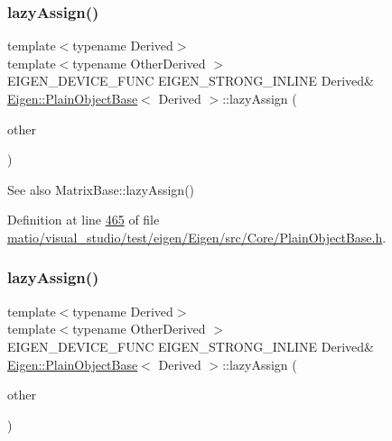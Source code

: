 \subsubsection{\texorpdfstring{lazy\+Assign()}{lazyAssign()}\hspace{0.1cm}{\footnotesize\ttfamily [1/2]}}
{\footnotesize\ttfamily template$<$typename Derived$>$ \\
template$<$typename Other\+Derived $>$ \\
E\+I\+G\+E\+N\+\_\+\+D\+E\+V\+I\+C\+E\+\_\+\+F\+U\+NC E\+I\+G\+E\+N\+\_\+\+S\+T\+R\+O\+N\+G\+\_\+\+I\+N\+L\+I\+NE Derived\& \hyperlink{class_eigen_1_1_plain_object_base}{Eigen\+::\+Plain\+Object\+Base}$<$ Derived $>$\+::lazy\+Assign (\begin{DoxyParamCaption}\item[{const \hyperlink{group___core___module_class_eigen_1_1_dense_base}{Dense\+Base}$<$ Other\+Derived $>$ \&}]{other }\end{DoxyParamCaption})\hspace{0.3cm}{\ttfamily [inline]}}

\begin{DoxySeeAlso}{See also}
Matrix\+Base\+::lazy\+Assign() 
\end{DoxySeeAlso}


Definition at line \hyperlink{matio_2visual__studio_2test_2eigen_2_eigen_2src_2_core_2_plain_object_base_8h_source_l00465}{465} of file \hyperlink{matio_2visual__studio_2test_2eigen_2_eigen_2src_2_core_2_plain_object_base_8h_source}{matio/visual\+\_\+studio/test/eigen/\+Eigen/src/\+Core/\+Plain\+Object\+Base.\+h}.

\mbox{\label{class_eigen_1_1_plain_object_base_a6008cee3b716d514b3e14c1bc7c0d34a}} 
\subsubsection{\texorpdfstring{lazy\+Assign()}{lazyAssign()}\hspace{0.1cm}{\footnotesize\ttfamily [2/2]}}
{\footnotesize\ttfamily template$<$typename Derived$>$ \\
template$<$typename Other\+Derived $>$ \\
E\+I\+G\+E\+N\+\_\+\+D\+E\+V\+I\+C\+E\+\_\+\+F\+U\+NC E\+I\+G\+E\+N\+\_\+\+S\+T\+R\+O\+N\+G\+\_\+\+I\+N\+L\+I\+NE Derived\& \hyperlink{class_eigen_1_1_plain_object_base}{Eigen\+::\+Plain\+Object\+Base}$<$ Derived $>$\+::lazy\+Assign (\begin{DoxyParamCaption}\item[{const \hyperlink{group___core___module_class_eigen_1_1_dense_base}{Dense\+Base}$<$ Other\+Derived $>$ \&}]{other }\end{DoxyParamCaption})\hspace{0.3cm}{\ttfamily [inline]}}

